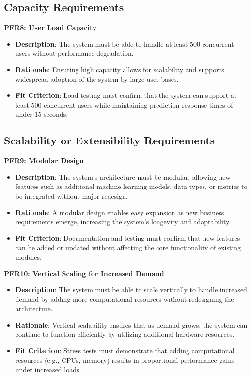 \documentclass[12pt]{article}
\begin{document}
\subsection{Capacity Requirements}
\textbf{PFR8: User Load Capacity}
\begin{itemize}
    \item \textbf{Description}: The system must be able to handle at least 500
    concurrent users without performance degradation.
    \item \textbf{Rationale}: Ensuring high capacity allows for scalability and
    supports widespread adoption of the system by large user bases.
    \item \textbf{Fit Criterion}: Load testing must confirm that the system can
    support at least 500 concurrent users while maintaining prediction response
    times of under 15 seconds.
\end{itemize}

\subsection{Scalability or Extensibility Requirements}
\textbf{PFR9: Modular Design}
\begin{itemize}
    \item \textbf{Description}: The system’s architecture must be modular,
    allowing new features such as additional machine learning models, data
    types, or metrics to be integrated without major redesign.
    \item \textbf{Rationale}: A modular design enables easy expansion as new
    business requirements emerge, increasing the system’s longevity and
    adaptability.
    \item \textbf{Fit Criterion}: Documentation and testing must confirm that
    new features can be added or updated without affecting the core
    functionality of existing modules.
\end{itemize}
\textbf{PFR10: Vertical Scaling for Increased Demand}
\begin{itemize}
    \item \textbf{Description}: The system must be able to scale vertically to
    handle increased demand by adding more computational resources without
    redesigning the architecture.
    \item \textbf{Rationale}: Vertical scalability ensures that as demand grows,
    the system can continue to function efficiently by utilizing additional
    hardware resources.
    \item \textbf{Fit Criterion}: Stress tests must demonstrate that adding
    computational resources (e.g., CPUs, memory) results in proportional
    performance gains under increased loads.
\end{itemize}
\end{document}
